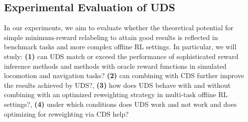 
\newcommand{\CC}{\cellcolor{Gray}}

\subsection{Experimental Evaluation of UDS}
\label{sec:exp}
In our experiments, we aim to evaluate whether the theoretical potential for simple minimum-reward relabeling to attain good results is reflected in benchmark tasks and more complex offline RL settings. In particular, we will study: \textbf{(1)} can UDS match or exceed the performance of sophisticated reward inference methods and methods with oracle reward functions in simulated locomotion and navigation tasks? \textbf{(2)} can combining with CDS further improve the results achieved by UDS?, \textbf{(3)} how does UDS behave with and without combining with an optimized reweighting strategy in multi-task offline RL settings?, \textbf{(4)} under which conditions does UDS work and not work and does optimizing for reweighting via CDS help?

